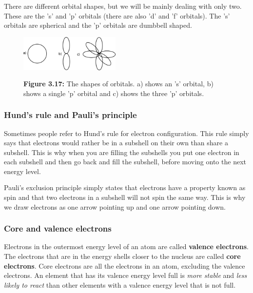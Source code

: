     \noindent
  \label{m38741*eip-793}There are different orbital shapes, but we will be mainly dealing with only two. These are the 's' and 'p' orbitals (there are also 'd' and 'f' orbitals). The 's' orbitals are spherical and the 'p' orbitals are dumbbell shaped. 
    \setcounter{subfigure}{0}
	\begin{figure}[H] %
    \begin{center}
    \label{m38741*uid8934!!!underscore!!!media}\label{m38741*uid8934!!!underscore!!!printimage}\includegraphics[width=5cm]{col11305.imgs/m38741_orbitals.png} %
      \vspace{2pt}
    \vspace{\rubberspace}\par \begin{cnxcaption}
	  \small \textbf{Figure 3.17: }The shapes of orbitals. a) shows an 's' orbital, b) shows a single 'p' orbital and c) shows the three 'p' orbitals.
	\end{cnxcaption}
    \vspace{.1in}
    \end{center}
 \end{figure}       \par \label{m38741*eip-581}
            \subsubsection{ Hund's rule and Pauli's principle}
            \nopagebreak
            \label{m38741*eip-188}
Sometimes people refer to Hund's rule for electron configuration. This rule simply says that electrons would rather be in a subshell on their own than share a subshell. This is why when you are filling the subshells you put one electron in each subshell and then go back and fill the subshell, before moving onto the next energy level.
\par 
\label{m38741*eip-id1167385514309}
Pauli's exclusion principle simply states that electrons have a property known as spin and that two electrons in a subshell will not spin the same way. This is why we draw electrons as one arrow pointing up and one arrow pointing down.
\par \label{m38741*uid104}
            \subsubsection{ Core and valence electrons}
            \nopagebreak
        \label{m38741*id259935}Electrons in the outermost energy level of an atom are called \textbf{valence electrons}. The electrons that are in the energy shells closer to the nucleus are called \textbf{core electrons}. Core electrons are all the electrons in an atom, excluding the valence electrons. An element that has its valence energy level full is \textsl{more stable} and \textsl{less likely to react} than other elements with a valence energy level that is not full.\par 

